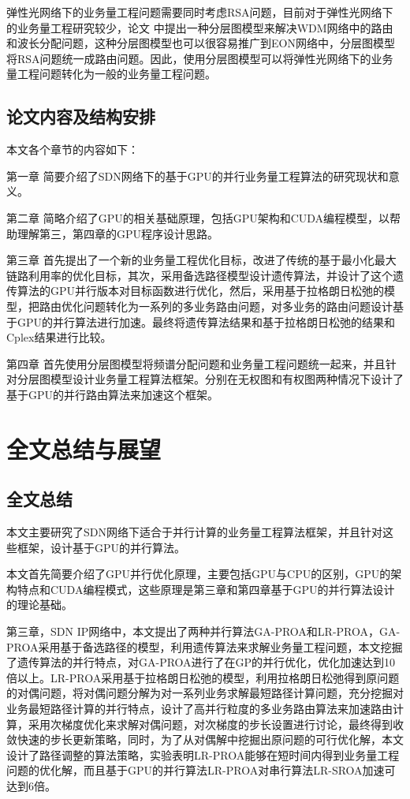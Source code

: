\documentclass[master]{thesis-uestc}
\begin{document}
弹性光网络下的业务量工程问题需要同时考虑RSA问题，目前对于弹性光网络下的业务量工程研究较少，论文 中提出一种分层图模型来解决WDM网络中的路由和波长分配问题，这种分层图模型也可以很容易推广到EON网络中，分层图模型将RSA问题统一成路由问题。因此，使用分层图模型可以将弹性光网络下的业务量工程问题转化为一般的业务量工程问题。

\section{论文内容及结构安排}
本文各个章节的内容如下：

第一章 简要介绍了SDN网络下的基于GPU的并行业务量工程算法的研究现状和意义。

第二章 简略介绍了GPU的相关基础原理，包括GPU架构和CUDA编程模型，以帮助理解第三，第四章的GPU程序设计思路。

第三章 首先提出了一个新的业务量工程优化目标，改进了传统的基于最小化最大链路利用率的优化目标，其次，采用备选路径模型设计遗传算法，并设计了这个遗传算法的GPU并行版本对目标函数进行优化，然后，采用基于拉格朗日松弛的模型，把路由优化问题转化为一系列的多业务路由问题，对多业务的路由问题设计基于GPU的并行算法进行加速。最终将遗传算法结果和基于拉格朗日松弛的结果和Cplex结果进行比较。

第四章 首先使用分层图模型将频谱分配问题和业务量工程问题统一起来，并且针对分层图模型设计业务量工程算法框架。分别在无权图和有权图两种情况下设计了基于GPU的并行路由算法来加速这个框架。



\chapter{全文总结与展望}
\section{全文总结}
本文主要研究了SDN网络下适合于并行计算的业务量工程算法框架，并且针对这些框架，设计基于GPU的并行算法。

本文首先简要介绍了GPU并行优化原理，主要包括GPU与CPU的区别，GPU的架构特点和CUDA编程模式，这些原理是第三章和第四章基于GPU的并行算法设计的理论基础。

第三章，SDN IP网络中，本文提出了两种并行算法GA-PROA和LR-PROA，GA-PROA采用基于备选路径的模型，利用遗传算法来求解业务量工程问题，本文挖掘了遗传算法的并行特点，对GA-PROA进行了在GP的并行优化，优化加速达到10倍以上。LR-PROA采用基于拉格朗日松弛的模型，利用拉格朗日松弛得到原问题的对偶问题，将对偶问题分解为对一系列业务求解最短路径计算问题，充分挖掘对业务最短路径计算的并行特点，设计了高并行粒度的多业务路由算法来加速路由计算，采用次梯度优化来求解对偶问题，对次梯度的步长设置进行讨论，最终得到收敛快速的步长更新策略，同时，为了从对偶解中挖掘出原问题的可行优化解，本文设计了路径调整的算法策略，实验表明LR-PROA能够在短时间内得到业务量工程问题的优化解，而且基于GPU的并行算法LR-PROA对串行算法LR-SROA加速可达到6倍。
\end{document}
